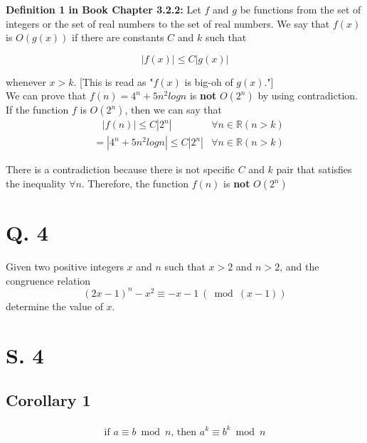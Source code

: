 \documentclass[11pt]{article}
\begin{document}
\textbf{Definition 1 in Book Chapter 3.2.2: } Let $f$ and $g$ be functions from the set of integers or the set of real numbers to the set of real numbers. We say that $f(x)$ is $O(g(x))$ if there are constants $C$ and $k$ such that

\begin{equation*}
    |f(x)| \leq C |g(x)|
\end{equation*}

whenever $x > k$. [This is read as "$f(x)$ is big-oh of $g(x)$."]\\

\noindent We can prove that $f(n) = 4^n + 5n^2logn$ is \textbf{not} $O(2^n)$ by using contradiction. If the function $f$ is $O(2^n)$, then we can say that
\begin{align}
    &\ \ \ \ |f(n)| \leq C |2^n| &\forall n \in \mathbb{R}(n > k)\\
    &=|4^n + 5n^2logn| \leq C |2^n| &\forall n \in \mathbb{R}(n > k)
\end{align}

There is a contradiction because there is not specific $C$ and $k$ pair that satisfies the inequality $\forall n$. Therefore, the function $f(n)$ is \textbf{not} $O(2^n)$

\newpage

\section*{Q. 4}
Given two positive integers $x$ and $n$ such that $x > 2$ and $n > 2$, and the congruence relation
\begin{equation*}
    (2x - 1)^n - x^2 \equiv -x - 1\ (\bmod{(x-1)})  
\end{equation*}
determine the value of $x$.

\section*{S. 4}
\subsection*{Corollary 1}
\begin{align}
    \text{if } a \equiv b \bmod{n} \text{, then } a^k \equiv b^k \bmod{n}
\end{align}
\end{document}
